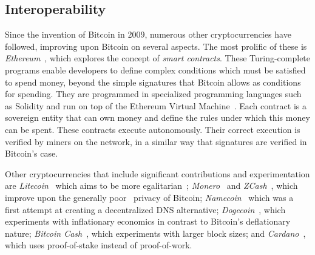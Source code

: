 \subsection{Interoperability}
Since the invention of Bitcoin in 2009, numerous other cryptocurrencies have
followed, improving upon Bitcoin on several aspects. The most prolific of these
is \emph{Ethereum}~\cite{buterin}, which explores the concept of \emph{smart
contracts}. These Turing-complete programs enable developers to define complex
conditions which must be satisfied to spend money, beyond the simple signatures
that Bitcoin allows as conditions for spending. They are programmed in
specialized programming languages such as Solidity and run on top of the
Ethereum Virtual Machine~\cite{wood}. Each contract is a sovereign entity that
can own money and define the rules under which this money can be spent. These
contracts execute autonomously. Their correct execution is verified by miners on
the network, in a similar way that signatures are verified in Bitcoin's case.

Other cryptocurrencies that include significant contributions and
experimentation are \emph{Litecoin}~\cite{litecoin} which aims to be more
egalitarian~\cite{egalitarianism}; \emph{Monero}~\cite{cryptonote} and
\emph{ZCash}~\cite{zerocoin,zcash}, which improve upon the generally
poor~\cite{fistful,quantitative-bitcoin-analysis,tumblebit} privacy of
Bitcoin; \emph{Namecoin}~\cite{namecoin} which was a first attempt at creating a
decentralized DNS alternative; \emph{Dogecoin}~\cite{dogecoin}, which experiments with
inflationary economics in contrast to Bitcoin's deflationary nature;
\emph{Bitcoin Cash}~\cite{btcVSbch}, which experiments with larger block sizes; and
\emph{Cardano}~\cite{ouroboros}, which uses proof-of-stake instead of proof-of-work.


